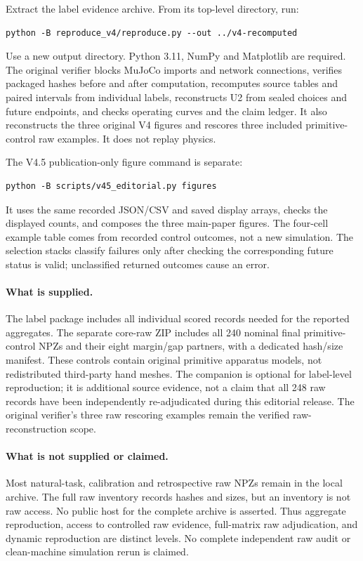 \documentclass[10pt]{article}
\begin{document}
Extract the label evidence archive. From its top-level directory, run:
\begin{lstlisting}
python -B reproduce_v4/reproduce.py --out ../v4-recomputed
\end{lstlisting}
Use a new output directory. Python 3.11, NumPy and Matplotlib are required.
The original verifier blocks MuJoCo imports and network connections, verifies
packaged hashes before and after computation, recomputes source tables and
paired intervals from individual labels, reconstructs U2 from sealed choices
and future endpoints, and checks operating curves and the claim ledger. It
also reconstructs the three original V4 figures and rescores three included
primitive-control raw examples. It does not replay physics.

The V4.5 publication-only figure command is separate:
\begin{lstlisting}
python -B scripts/v45_editorial.py figures
\end{lstlisting}
It uses the same recorded JSON/CSV and saved display arrays, checks the
displayed counts, and composes the three main-paper figures. The four-cell
example table comes from recorded control outcomes, not a new simulation.
The selection stacks classify failures only after checking the corresponding
future status is valid; unclassified returned outcomes cause an error.

\paragraph{What is supplied.}
The label package includes all individual scored records needed for the
reported aggregates. The separate core-raw ZIP includes all 240 nominal final
primitive-control NPZs and their eight margin/gap partners, with a dedicated
hash/size manifest. These controls contain original primitive apparatus
models, not redistributed third-party hand meshes. The companion is optional
for label-level reproduction; it is additional source evidence, not a claim
that all 248 raw records have been independently re-adjudicated during this
editorial release. The original verifier's three raw rescoring examples remain
the verified raw-reconstruction scope.

\paragraph{What is not supplied or claimed.}
Most natural-task, calibration and retrospective raw NPZs remain in the local
archive. The full raw inventory records hashes and sizes, but an inventory is
not raw access. No public host for the complete archive is asserted. Thus
aggregate reproduction, access to controlled raw evidence, full-matrix raw
adjudication, and dynamic reproduction are distinct levels. No complete
independent raw audit or clean-machine simulation rerun is claimed.
\end{document}
